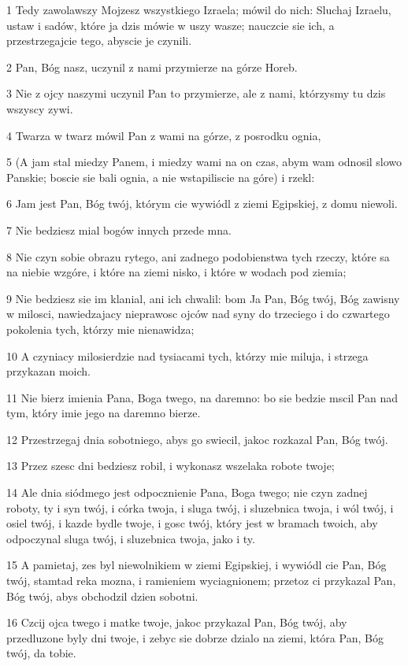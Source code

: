 \par 1 Tedy zawolawszy Mojzesz wszystkiego Izraela; mówil do nich: Sluchaj Izraelu, ustaw i sadów, które ja dzis mówie w uszy wasze; nauczcie sie ich, a przestrzegajcie tego, abyscie je czynili.
\par 2 Pan, Bóg nasz, uczynil z nami przymierze na górze Horeb.
\par 3 Nie z ojcy naszymi uczynil Pan to przymierze, ale z nami, którzysmy tu dzis wszyscy zywi.
\par 4 Twarza w twarz mówil Pan z wami na górze, z posrodku ognia,
\par 5 (A jam stal miedzy Panem, i miedzy wami na on czas, abym wam odnosil slowo Panskie; boscie sie bali ognia, a nie wstapiliscie na góre) i rzekl:
\par 6 Jam jest Pan, Bóg twój, którym cie wywiódl z ziemi Egipskiej, z domu niewoli.
\par 7 Nie bedziesz mial bogów innych przede mna.
\par 8 Nie czyn sobie obrazu rytego, ani zadnego podobienstwa tych rzeczy, które sa na niebie wzgóre, i które na ziemi nisko, i które w wodach pod ziemia;
\par 9 Nie bedziesz sie im klanial, ani ich chwalil: bom Ja Pan, Bóg twój, Bóg zawisny w milosci, nawiedzajacy nieprawosc ojców nad syny do trzeciego i do czwartego pokolenia tych, którzy mie nienawidza;
\par 10 A czyniacy milosierdzie nad tysiacami tych, którzy mie miluja, i strzega przykazan moich.
\par 11 Nie bierz imienia Pana, Boga twego, na daremno: bo sie bedzie mscil Pan nad tym, który imie jego na daremno bierze.
\par 12 Przestrzegaj dnia sobotniego, abys go swiecil, jakoc rozkazal Pan, Bóg twój.
\par 13 Przez szesc dni bedziesz robil, i wykonasz wszelaka robote twoje;
\par 14 Ale dnia siódmego jest odpocznienie Pana, Boga twego; nie czyn zadnej roboty, ty i syn twój, i córka twoja, i sluga twój, i sluzebnica twoja, i wól twój, i osiel twój, i kazde bydle twoje, i gosc twój, który jest w bramach twoich, aby odpoczynal sluga twój, i sluzebnica twoja, jako i ty.
\par 15 A pamietaj, zes byl niewolnikiem w ziemi Egipskiej, i wywiódl cie Pan, Bóg twój, stamtad reka mozna, i ramieniem wyciagnionem; przetoz ci przykazal Pan, Bóg twój, abys obchodzil dzien sobotni.
\par 16 Czcij ojca twego i matke twoje, jakoc przykazal Pan, Bóg twój, aby przedluzone byly dni twoje, i zebyc sie dobrze dzialo na ziemi, która Pan, Bóg twój, da tobie.
